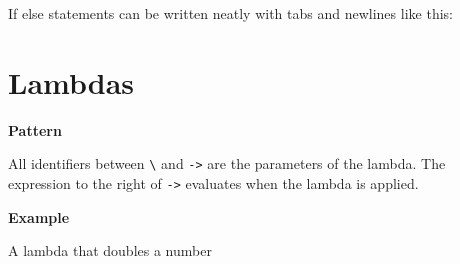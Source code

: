 If else statements can be written neatly with tabs and newlines like
this:

\begin{Shaded}
\begin{Highlighting}[]
  \OtherTok{{-}\textgreater{}} 
\OtherTok{=} \OperatorTok{\textgreater{}} \NormalTok{) }
  \NormalTok{ (}\OperatorTok{==} \NormalTok{) }
      
    \NormalTok{ (} \OperatorTok{+} \NormalTok{)) }
  \NormalTok{ (}\OperatorTok{==} \NormalTok{) }
      
    \NormalTok{ (}\NormalTok{ (} \OperatorTok{==}
        
       \NormalTok{))}
\end{Highlighting}
\end{Shaded}

\section{Lambdas}\label{haskell-cheat-sheet.md__lambdas}

\textbf{Pattern}

\begin{Shaded}
\begin{Highlighting}[]
\OtherTok{{-}\textgreater{}} \OperatorTok{\textless{}}\OperatorTok{\textgreater{}}
\end{Highlighting}
\end{Shaded}

All identifiers between \texttt{\textbackslash{}} and
\texttt{-\textgreater{}} are the parameters of the lambda. The
expression to the right of \texttt{-\textgreater{}} evaluates when the
lambda is applied.

\textbf{Example}

A lambda that doubles a number

\begin{Shaded}
\begin{Highlighting}[]
\OtherTok{{-}\textgreater{}}\OperatorTok{+}
\end{Highlighting}
\end{Shaded}

